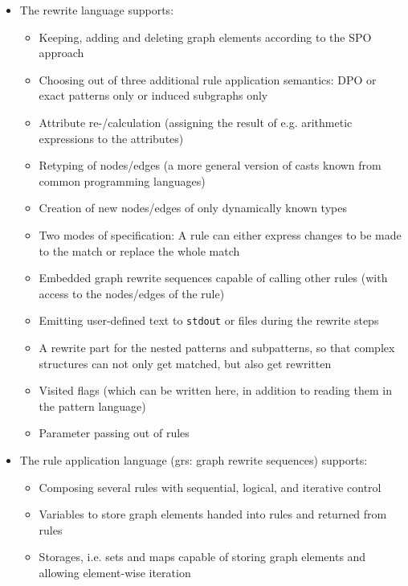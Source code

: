 \begin{itemize}
  \item The rewrite language supports:
  \begin{itemize}
    \item Keeping, adding and deleting graph elements according to the SPO approach
	\item Choosing out of three additional rule application semantics: DPO or exact patterns only or induced subgraphs only
    \item Attribute re-/calculation (assigning the result of e.g. arithmetic expressions to the attributes)
    \item Retyping of nodes/edges (a more general version of casts known from common programming languages)
    \item Creation of new nodes/edges of only dynamically known types
    \item Two modes of specification: A rule can either express changes to be made to the match or replace the whole match
    \item Embedded graph rewrite sequences capable of calling other rules (with access to the nodes/edges of the rule)
    \item Emitting user-defined text to \texttt{stdout} or files during the rewrite steps
	\item A rewrite part for the nested patterns and subpatterns, so that complex structures can not only get matched, but also get rewritten
	\item Visited flags (which can be written here, in addition to reading them in the pattern language)
    \item Parameter passing out of rules
  \end{itemize}
  
  \item The rule application language (grs: graph rewrite sequences) supports:
  \begin{itemize}
    \item Composing several rules with sequential, logical, and iterative control
    \item Variables to store graph elements handed into rules and returned from rules
	\item Storages, i.e. sets and maps capable of storing graph elements and allowing element-wise iteration
  \end{itemize}
\end{itemize}

